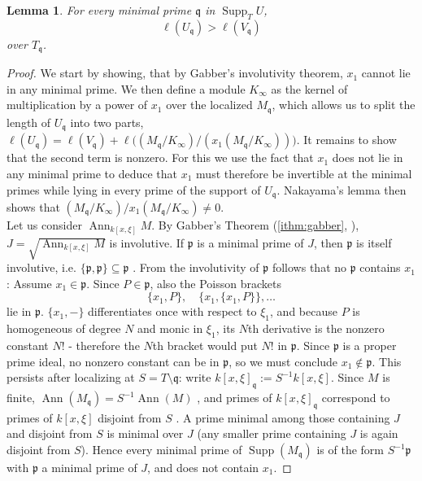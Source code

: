 \documentclass[pdflatex,sn-mathphys-num]{sn-jnl}
\numberwithin{equation}{section}
\theoremstyle{thmstyleone}
\newtheorem{lemma}[theorem]{Lemma}
\theoremstyle{thmstyletwo}
\begin{document}
\begin{lemma}\label{lem:strict-support-inequality}
For every minimal prime $\mathfrak q$ in $\operatorname{Supp}_T U$,
\[
 \ell(U_{\mathfrak q})
 > \ell(V_{\mathfrak q})
\] over $T_{\mathfrak q}$.
\end{lemma}
\begin{proof}
We start by showing, that by Gabber's involutivity theorem, $x_1$ cannot lie in any minimal prime. We then define a module $K_{\infty}$ as the kernel of multiplication by a power of $x_1$ over the localized $M_\mathfrak q$, which allows us to split the length of $U_{\mathfrak q}$ into two parts, $\ell(U_{\mathfrak q}) = \ell(V_{\mathfrak q}) + \ell\bigl((M_{\mathfrak q}/K_{\infty})/({x_1}(M_{\mathfrak q}/K_{\infty}))\bigr)$. It remains to show that the second term is nonzero. For this we use the fact that $x_1$ does not lie in any minimal prime to deduce that $x_1$ must therefore be invertible at the minimal primes while lying in every prime of the support of $U_{\mathfrak q}$. Nakayama's lemma then shows that  $(M_\mathfrak q/K_{\infty})/x_1(M_\mathfrak q/K_{\infty})\neq0$. \\


Let us consider $\operatorname{Ann}_{k[x,\xi]} M$. By Gabber's Theorem (\ref{ithm:gabber}, \cite{Gabber1981}), $J = \sqrt{\operatorname{Ann}_{k[x,\xi]} M}$ is involutive.
If $\mathfrak p$ is a minimal prime of $J$,
then $\mathfrak p$ is itself involutive, i.e. $\{\mathfrak p,\mathfrak p\}\subseteq\mathfrak p$ \cite[Thm. D.3.4]{HTT}.
From the involutivity of $\mathfrak p$ follows that no $\mathfrak p$ contains ${x_1}$: Assume ${x_1}\in \mathfrak p$. Since $P \in \mathfrak p$,  also the Poisson brackets
\[ \{{x_1}, P\}, \quad \{{x_1}, \{x_1, P\}\}, \dots\]
lie in $\mathfrak p$. $\{{x_1},-\}$ differentiates once with respect to $\xi_1$, and because $P$ is homogeneous of degree $N$ and monic in $\xi_1$, its $N$th derivative is the nonzero constant $N!$ - therefore the $N$th bracket would put $N!$ in $\mathfrak p$. Since $\mathfrak p$ is a proper prime ideal, no nonzero constant can be in $\mathfrak p$, so we must conclude ${x_1} \notin \mathfrak p$.
This persists after localizing at $S=T\setminus\mathfrak q$: write $k[x,\xi]_{\mathfrak q}:=S^{-1}k[x,\xi]$. Since $M$ is finite, $\operatorname{Ann}(M_{\mathfrak q})=S^{-1}\operatorname{Ann}(M)$ \cite[Prop 3.14]{atiyah}, and primes of $k[x,\xi]_{\mathfrak q}$ correspond to primes of $k[x,\xi]$ disjoint from $S$ \cite[Prop 3.11(iv)]{atiyah}. A prime minimal among those containing $J$ and disjoint from $S$ is minimal over $J$ (any smaller prime containing $J$ is again disjoint from $S$). Hence every minimal prime of $\operatorname{Supp}(M_{\mathfrak q})$ is of the form $S^{-1}\mathfrak p$ with $\mathfrak p$ a minimal prime of $J$, and does not contain ${x_1}$.


\end{proof}
\end{document}
